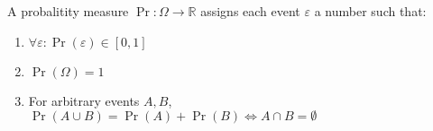 A probalitity measure $\operatorname{Pr}: \Omega \to \mathbb{R}$ assigns each event $\varepsilon$ a number such that:
\begin{enumerate}
	\item $\forall \varepsilon : \operatorname{Pr}(\varepsilon) \in [0, 1]$
	\item $\operatorname{Pr}(\Omega) = 1$
	\item For arbitrary events $A,B$, $\operatorname{Pr}(A \cup B) = \operatorname{Pr}(A) + \operatorname{Pr}(B) \iff A \cap B = \emptyset$
\end{enumerate}
